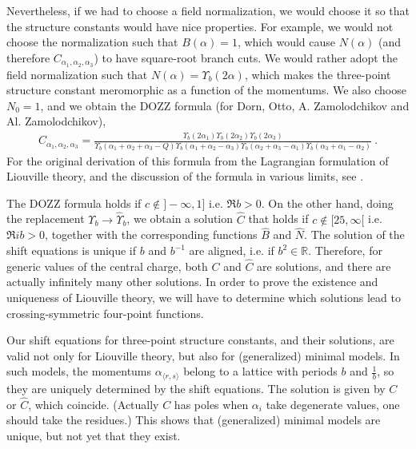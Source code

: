 \documentclass[12pt, a4paper]{article}
\theoremstyle{break}
\begin{document}
Nevertheless, if we had to choose a field normalization, we would choose it so that the structure constants would have nice properties. 
For example, we would not choose 
the normalization such that $B(\alpha)=1$, which would cause $N(\alpha)$ (and therefore $C_{\alpha_1,\alpha_2,\alpha_3}$) to have square-root branch cuts.
We would rather adopt the field normalization such that $N(\alpha)=\Upsilon_b(2\alpha)$, which makes the three-point structure constant meromorphic as a function of the momentums.
We also choose $N_0=1$, and  
we obtain the DOZZ formula (for Dorn, Otto, A.
Zamolodchikov and Al. Zamolodchikov),
\begin{align}
 C_{\alpha_1,\alpha_2,\alpha_3} =  \frac{\Upsilon_b(2\alpha_1) \Upsilon_b(2\alpha_2) \Upsilon_b(2\alpha_3)}{\Upsilon_b(\alpha_1+\alpha_2+\alpha_3-Q) \Upsilon_b(\alpha_1+\alpha_2-\alpha_3)\Upsilon_b(\alpha_2+\alpha_3-\alpha_1)\Upsilon_b(\alpha_3+\alpha_1-\alpha_2)} \ .
\label{caaa}
\end{align}
For the original derivation of this formula from the Lagrangian formulation of Liouville theory, and the discussion of the formula in various limits, see \cite{zz95}.

The DOZZ formula holds if
$c\notin ]-\infty, 1]$ i.e. $\Re b>0$. 
On the other hand, doing the replacement $\Upsilon_b\to \hat\Upsilon_b$, we obtain a solution $\hat C$ that holds if  $c\notin [25,\infty[$ i.e. $\Re ib>0$, together with the corresponding functions $\hat B$ and $\hat N$.
The solution of the shift equations is unique if $b$ and $b^{-1}$ are aligned, i.e. if $b^2\in\mathbb{R}$. Therefore, for generic values of the central charge, both $C$ and $\hat C$ are solutions, and there are actually infinitely many other solutions. In order to prove the existence and uniqueness of Liouville theory, we will have to determine which solutions lead to crossing-symmetric four-point functions.

Our shift equations for three-point structure constants, and their solutions, are valid not only for Liouville theory, but also for (generalized) minimal models. In such models, the momentums $\alpha_{\langle r,s\rangle}$ belong to a lattice with periods $b$ and $\frac{1}{b}$, so they are uniquely determined by the shift equations. The solution is given by $C$ or $\hat C$, which coincide. (Actually $C$ has poles when $\alpha_i$ take degenerate values, one should take the residues.) This shows that (generalized) minimal models are unique, but not yet that they exist.
\end{document}
